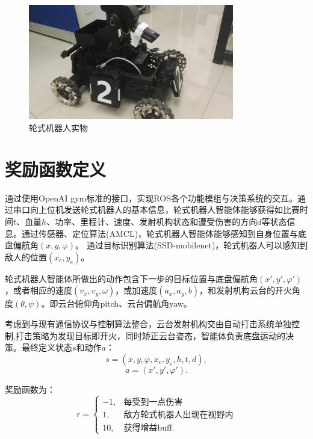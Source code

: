 \begin{figure}[ht]
  \centering
  \includegraphics[width=0.80\textwidth]{figures/robot.jpg}
  \caption{轮式机器人实物}\label{realrobot}
\end{figure}

\section{奖励函数定义}
通过使用OpenAI gym标准的接口，实现ROS各个功能模组与决策系统的交互。通过串口向上位机发送轮式机器人的基本信息，轮式机器人智能体能够获得如比赛时间$t$、血量$h$、功率、里程计、速度、发射机构状态和遭受伤害的方向$d$等状态信息。通过传感器、定位算法(AMCL)，轮式机器人智能体能够感知到自身位置与底盘偏航角$\left( x, y, \varphi \right)$。 通过目标识别算法(SSD-mobilenet)，轮式机器人可以感知到敌人的位置$\left( x_e, y_e\right)$。

轮式机器人智能体所做出的动作包含下一步的目标位置与底盘偏航角$\left( x', y', \varphi' \right)$，或者相应的速度$\left( v_x, v_y, \omega \right)$，或加速度$\left( a_x, a_y, b \right)$，和发射机构云台的开火角度$\left( \theta, \psi \right)$。即云台俯仰角pitch、云台偏航角yaw。

考虑到与现有通信协议与控制算法整合，云台发射机构交由自动打击系统单独控制,打击策略为发现目标即开火，同时矫正云台姿态，智能体负责底盘运动的决策。最终定义状态$s$和动作$a$：
\begin{equation}
s = \left( x, y, \varphi, x_e, y_e, h, t, d \right),
\end{equation}
\begin{equation}
a = \left( x', y', \varphi' \right).
\end{equation}

奖励函数为：
\begin{equation}\label{reward}
r =
\begin{cases}
-1,  & \text{每受到一点伤害} \\
1, & \text{敌方轮式机器人出现在视野内} \\
10, & \text{获得增益buff}.
\end{cases}
\end{equation}

